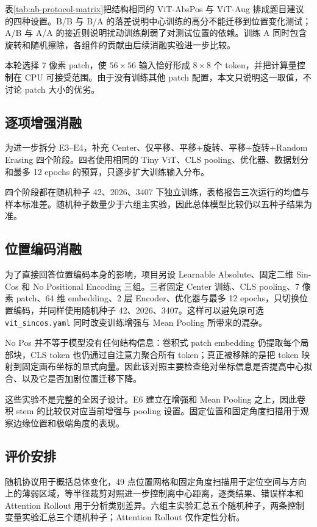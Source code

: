 

表\ref{tab:ab-protocol-matrix}把结构相同的 ViT-AbsPos 与 ViT-Aug 排成题目建议的四种设置。B/B 与 B/A 的落差说明中心训练的高分不能迁移到位置变化测试；A/B 与 A/A 的接近则说明扰动训练削弱了对测试位置的依赖。训练 A 同时包含旋转和随机擦除，各组件的贡献由后续消融实验进一步比较。

本轮选择 7 像素 patch，使 $56\times56$ 输入恰好形成 $8\times8$ 个 token，并把计算量控制在 CPU 可接受范围。由于没有训练其他 patch 配置，本文只说明这一取值，不讨论 patch 大小的优劣。

\subsection{逐项增强消融}

为进一步拆分 E3--E4，补充 Center、仅平移、平移+旋转、平移+旋转+Random Erasing 四个阶段。四者使用相同的 Tiny ViT、CLS pooling、优化器、数据划分和最多 12 epochs 的预算，只逐步扩大训练输入分布。

四个阶段都在随机种子 42、2026、3407 下独立训练，表格报告三次运行的均值与样本标准差。随机种子数量少于六组主实验，因此总体模型比较仍以五种子结果为准。

\subsection{位置编码消融}

为了直接回答位置编码本身的影响，项目另设 Learnable Absolute、固定二维 Sin-Cos 和 No Positional Encoding 三组。三者固定 Center 训练、CLS pooling、7 像素 patch、64 维 embedding、2 层 Encoder、优化器与最多 12 epochs，只切换位置编码，并同样使用随机种子 42、2026、3407。这样可以避免原可选 \texttt{vit\_sincos.yaml} 同时改变训练增强与 Mean Pooling 所带来的混杂。

No Pos 并不等于模型没有任何结构信息：卷积式 patch embedding 仍提取每个局部块，CLS token 也仍通过自注意力聚合所有 token；真正被移除的是把 token 映射到固定画布坐标的显式向量。因此该对照主要检查绝对坐标信息是否提高中心拟合、以及它是否加剧位置迁移下降。

这些实验不是完整的全因子设计。E6 建立在增强和 Mean Pooling 之上，因此卷积 stem 的比较仅对应当前增强与 pooling 设置。固定位置和固定角度扫描用于观察边缘位置和极端角度的表现。

\subsection{评价安排}

随机协议用于概括总体变化，49 点位置网格和固定角度扫描用于定位空间与方向上的薄弱区域，等半径裁剪对照进一步控制离中心距离，逐类结果、错误样本和 Attention Rollout 用于分析类别差异。六组主实验汇总五个随机种子，两条控制变量实验汇总三个随机种子；Attention Rollout 仅作定性分析。
